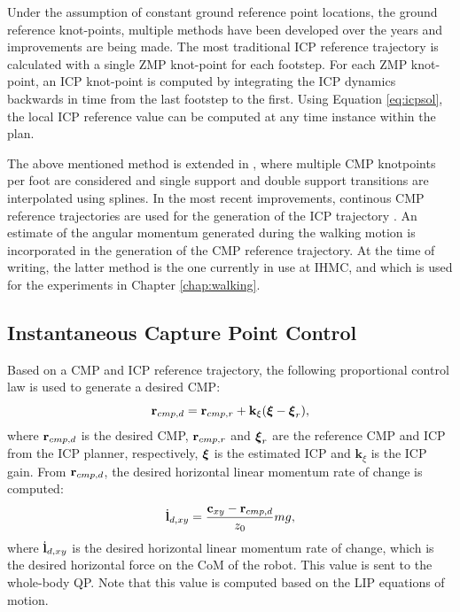 Under the assumption of constant ground reference point locations, the ground reference knot-points, multiple methods have been developed over the years and improvements are being made. The most traditional \ac{ICP} reference trajectory is calculated with a single \ac{ZMP} knot-point \cite{englsberger2012integration} for each footstep. For each \ac{ZMP} knot-point, an \ac{ICP} knot-point is computed by integrating the \ac{ICP} dynamics backwards in time from the last footstep to the first. Using Equation \eqref{eq:icpsol}, the local \ac{ICP} reference value can be computed at any time instance within the plan. 

The above mentioned method is extended in \cite{englsberger2014trajectory}, where multiple \ac{CMP} knotpoints per foot are considered and single support and double support transitions are interpolated using splines. In the most recent improvements, continous \ac{CMP} reference trajectories are used for the generation of the \ac{ICP} trajectory \cite{seyde2018inclusion}. An estimate of the angular momentum generated during the walking motion is incorporated in the generation of the \ac{CMP} reference trajectory. At the time of writing, the latter method is the one currently in use at \ac{IHMC}, and which is used for the experiments in Chapter \ref{chap:walking}.
\subsection{Instantaneous Capture Point Control}\label{sec:icpcontrol}
Based on a \ac{CMP} and \ac{ICP} reference trajectory, the following proportional control law is used to generate a desired \ac{CMP}:
\begin{equation}
    \mathbf{r}_{cmp,d}=\mathbf{r}_{cmp,r} + \mathbf{k}_{\xi}(\boldsymbol{\xi}-\boldsymbol{\xi}_r),
    \label{eq:rcmpd}
\end{equation}
where $\mathbf{r}_{cmp,d}$ is the desired \ac{CMP}, $\mathbf{r}_{cmp,r}$ and $\boldsymbol{\xi}_r$ are the reference \ac{CMP} and \ac{ICP} from the \ac{ICP} planner, respectively, $\boldsymbol{\xi}$ is the estimated \ac{ICP} and $\mathbf{k}_{\xi}$ is the \ac{ICP} gain. From $\mathbf{r}_{cmp,d}$, the desired horizontal linear momentum rate of change is computed:
\begin{equation}\label{eq:dotldxy}
    \dot{\mathbf{l}}_{d,xy} = \frac{\mathbf{c}_{xy}-\mathbf{r}_{cmp,d}}{z_0}mg,
\end{equation}
where $\dot{\mathbf{l}}_{d,xy}$ is the desired horizontal linear momentum rate of change, which is the desired horizontal force on the \ac{CoM} of the robot. This value is sent to the whole-body \ac{QP}. Note that this value is computed based on the \ac{LIP} equations of motion. 


